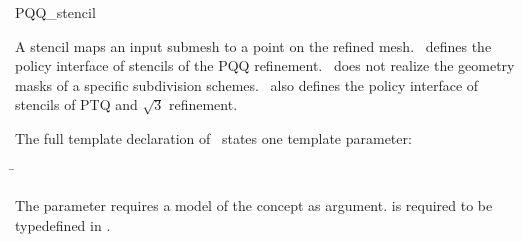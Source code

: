 
\ccRefPageBegin



\begin{ccRefClass}{PQQ_stencil}

\ccDefinition

A stencil maps an input submesh to a point on the refined 
mesh. \ccClassTemplateName\ defines the policy interface of 
stencils of the PQQ refinement. \ccClassTemplateName\ does not
realize the geometry masks of a specific subdivision schemes.
\ccClassTemplateName\ also defines the policy interface 
of stencils of PTQ and $\sqrt{3}$ refinement.




\ccParameters

The full template declaration of \ccClassTemplateName\ states one
template parameter:

\begin{tabbing}
 \= 
\end{tabbing}
   
The  parameter requires a model of 
the  concept as argument.  
is required to be typedefined in .


\end{ccRefClass}
